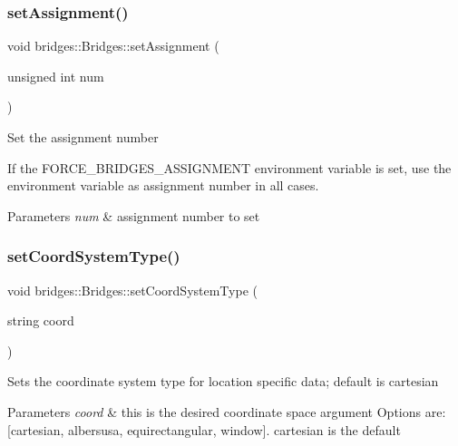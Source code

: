 \subsubsection{\texorpdfstring{set\+Assignment()}{setAssignment()}}
{\footnotesize\ttfamily void bridges\+::\+Bridges\+::set\+Assignment (\begin{DoxyParamCaption}\item[{unsigned int}]{num }\end{DoxyParamCaption})\hspace{0.3cm}{\ttfamily [inline]}}

Set the assignment number

If the F\+O\+R\+C\+E\+\_\+\+B\+R\+I\+D\+G\+E\+S\+\_\+\+A\+S\+S\+I\+G\+N\+M\+E\+NT environment variable is set, use the environment variable as assignment number in all cases.


\begin{DoxyParams}{Parameters}
{\em num} & assignment number to set \\
\hline
\end{DoxyParams}
\mbox{\label{classbridges_1_1_bridges_ad00c07d3a028110424909081a94c4013}} 
\subsubsection{\texorpdfstring{set\+Coord\+System\+Type()}{setCoordSystemType()}}
{\footnotesize\ttfamily void bridges\+::\+Bridges\+::set\+Coord\+System\+Type (\begin{DoxyParamCaption}\item[{string}]{coord }\end{DoxyParamCaption})\hspace{0.3cm}{\ttfamily [inline]}}

Sets the coordinate system type for location specific data; default is cartesian


\begin{DoxyParams}{Parameters}
{\em coord} & this is the desired coordinate space argument Options are\+: \mbox{[}\textquotesingle{}cartesian\textquotesingle{}, \textquotesingle{}albersusa\textquotesingle{}, \textquotesingle{}equirectangular\textquotesingle{}, \textquotesingle{}window\textquotesingle{}\mbox{]}. \textquotesingle{}cartesian\textquotesingle{} is the default \\
\hline
\end{DoxyParams}
\mbox{\label{classbridges_1_1_bridges_a7447e2d5808c492d26132690c1a639a7}} 
